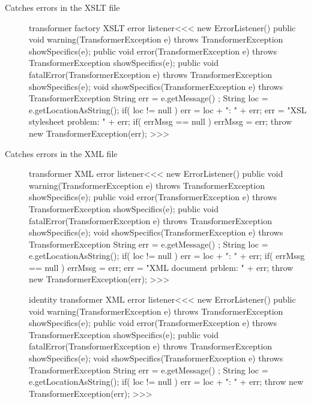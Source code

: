 \documentclass{article}
\begin{document}
\begin{description}
\item[Catches errors in the XSLT file]



\<transformer factory XSLT error listener\><<<
new ErrorListener() {
   public void warning(TransformerException e) throws TransformerException {
     showSpecifics(e);
   }
   public void error(TransformerException e) throws TransformerException {
     showSpecifics(e);
   }
   public void fatalError(TransformerException e) throws TransformerException {
     showSpecifics(e);
   }          
   void showSpecifics(TransformerException e)
                                               throws  TransformerException{
     String err = e.getMessage() ;
     String loc = e.getLocationAsString();
     if( loc != null ){ err = loc + ": " + err; }
     err = "XSL stylesheet problem: " + err;
     if( errMssg == null ){ errMssg = err; }
     throw new TransformerException(err);
}  }
>>>


\item [Catches errors in the XML file]

\<transformer XML error listener\><<<
new ErrorListener() {
   public void warning(TransformerException e) throws TransformerException {
     showSpecifics(e);
   }
   public void error(TransformerException e) throws TransformerException {
     showSpecifics(e);
   }
   public void fatalError(TransformerException e) throws TransformerException {
     showSpecifics(e);
   }          
   void showSpecifics(TransformerException e)
                                               throws  TransformerException{
     String err = e.getMessage() ;
     String loc = e.getLocationAsString();
     if( loc != null ){ err = loc + ": " + err; }
     if( errMssg == null ){ errMssg = err; }
     err = "XML document prblem: " + err;
     throw new TransformerException(err);
}  }
>>>


\<identity transformer XML error listener\><<<
new ErrorListener() {
   public void warning(TransformerException e) throws TransformerException {
     showSpecifics(e);
   }
   public void error(TransformerException e) throws TransformerException {
     showSpecifics(e);
   }
   public void fatalError(TransformerException e) throws TransformerException {
     showSpecifics(e);
   }          
   void showSpecifics(TransformerException e)
                                               throws  TransformerException{
     String err = e.getMessage() ;
     String loc = e.getLocationAsString();
     if( loc != null ){ err = loc + ": " + err; }
     throw new TransformerException(err);
}  }
>>>



\end{description}
\end{document}
